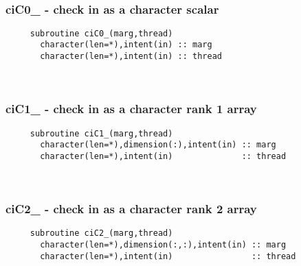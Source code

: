  
\mbox{}\hrulefill\ 
 
  \subsubsection{ciC0\_ - check in as a character scalar} 
  
\begin{verbatim} 
     subroutine ciC0_(marg,thread)
       character(len=*),intent(in) :: marg
       character(len=*),intent(in) :: thread
 \end{verbatim}%
 
 
\mbox{}\hrulefill\ 

  \subsubsection{ciC1\_ - check in as a character rank 1 array}

\begin{verbatim} 
     subroutine ciC1_(marg,thread)
       character(len=*),dimension(:),intent(in) :: marg
       character(len=*),intent(in)              :: thread
 \end{verbatim}%
 
 
\mbox{}\hrulefill\ 

  \subsubsection{ciC2\_ - check in as a character rank 2 array}

\begin{verbatim} 
     subroutine ciC2_(marg,thread)
       character(len=*),dimension(:,:),intent(in) :: marg
       character(len=*),intent(in)                :: thread
 \end{verbatim}%
 
